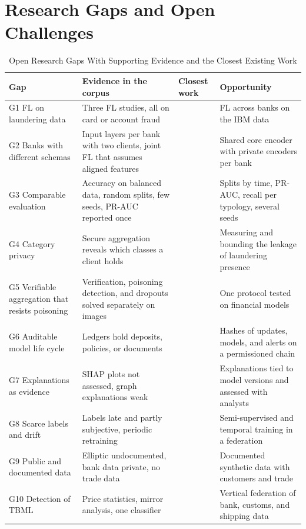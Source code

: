 \documentclass[journal]{IEEEtran}
\begin{document}
\section{Research Gaps and Open Challenges}
\label{sec:gaps}

\begin{table}[!t]
\centering
\caption{Open Research Gaps With Supporting Evidence and the Closest Existing Work}
\label{tab:gaps}
\footnotesize
\begin{tabularx}{\textwidth}{@{}L{3.55cm}YL{2.4cm}L{4.4cm}@{}}
\toprule
\textbf{Gap} & \textbf{Evidence in the corpus} & \textbf{Closest work} & \textbf{Opportunity}\\
\midrule
G1 FL on laundering data & Three FL studies, all on card or account fraud & \cite{tang2024sdt,awosika2024xai,li2026plc} & FL across banks on the IBM data\\
G2 Banks with different schemas & Input layers per bank with two clients, joint FL that assumes aligned features & \cite{tang2024sdt,li2026plc} & Shared core encoder with private encoders per bank\\
G3 Comparable evaluation & Accuracy on balanced data, random splits, few seeds, PR-AUC reported once & \cite{jensen2023fighting,mao2026pmegnn} & Splits by time, PR-AUC, recall per typology, several seeds\\
G4 Category privacy & Secure aggregation reveals which classes a client holds & \cite{gao2023category} & Measuring and bounding the leakage of laundering presence\\
G5 Verifiable aggregation that resists poisoning & Verification, poisoning detection, and dropouts solved separately on images & \cite{yang2022accountable,zhang2023safelearning,wang2023vosa} & One protocol tested on financial models\\
G6 Auditable model life cycle & Ledgers hold deposits, policies, or documents & \cite{amber2026cbdc,yang2022accountable,cosmin2024notary} & Hashes of updates, models, and alerts on a permissioned chain\\
G7 Explanations as evidence & SHAP plots not assessed, graph explanations weak & \cite{awosika2024xai,luo2024mlad,nayak2026quantum} & Explanations tied to model versions and assessed with analysts\\
G8 Scarce labels and drift & Labels late and partly subjective, periodic retraining & \cite{irshad2024gcfmld,luo2024mlad,nayak2026quantum} & Semi-supervised and temporal training in a federation\\
G9 Public and documented data & Elliptic undocumented, bank data private, no trade data & \cite{ferretti2025gnn,altman2023ibmaml} & Documented synthetic data with customers and trade\\
G10 Detection of TBML & Price statistics, mirror analysis, one classifier & \cite{tiwari2025tbml,zdanowicz2009} & Vertical federation of bank, customs, and shipping data\\
\bottomrule
\end{tabularx}
\end{table}
\end{document}
